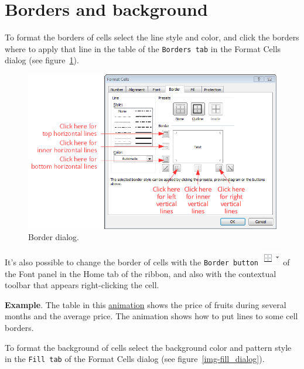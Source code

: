 \section{Borders and background}\hypertarget{borders-and-background}{}\label{borders-and-background}

To format the borders of cells select the line style and color, and click the borders where to apply that line in the
table of the \texttt{Borders tab} in the Format Cells dialog (see figure~\ref{img-border_dialog}).

\begin{figure}[htbp]
\begin{center}
\includegraphics[scale=0.7]{../img/border_dialog.png}
\end{center}
\caption{Border dialog.}
\label{img-border_dialog}
\end{figure}

It's also possible to change the border of cells with the \texttt{Border button}
\includegraphics[scale=0.7]{../img/button_border.png} of the Font panel in the Home tab of the ribbon, and also with the
contextual toolbar that appears right-clicking the cell.

\textbf{Example}. The table in this
\href{http://aprendeconalf.es/office/excel/manual/img/example_borders.gif}{animation} shows the price of fruits during several months and the average price. The animation shows how to put lines to some cell borders.

To format the background of cells select the background color and pattern style in the \texttt{Fill tab} of the Format
Cells dialog (see figure~\ref{img-fill_dialog}).

